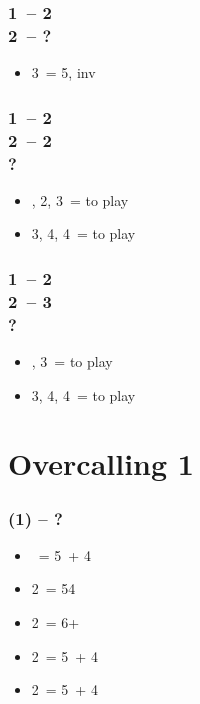 \subsubsection*{1\ntx\ -- 2\hearts \\
                2\spades\ -- ?}
\begin{itemize}
    \item 3\hearts\ = 5\hearts, inv
\end{itemize}

\subsubsection*{1\ntx\ -- 2\diams \\
                2\hearts\ -- 2\spades \\
                ?}
\begin{itemize}
    \item \pass, 2\nt, 3\hearts\ = to play
    \item 3\nt, 4\hearts, 4\spades\ = to play
\end{itemize}

\subsubsection*{1\ntx\ -- 2\hearts \\
                2\spades\ -- 3\hearts \\
                ?}
\begin{itemize}
    \item \pass, 3\spades\ = to play
    \item 3\nt, 4\hearts, 4\spades\ = to play
\end{itemize}

\section{\texorpdfstring{Overcalling 1\ntx}{overcalling1nt}}\label{sec:overcalling1nt}

\subsubsection*{(1\ntx) -- ?}
\begin{itemize}
    \item \dbl\ = 5\minor\ + 4\major
    \item 2\clubs\ = 54 \major
    \item 2\diams\ = 6+ \major
    \item 2\hearts\ = 5\hearts\ + 4\minor
    \item 2\spades\ = 5\spades\ + 4\minor
\end{itemize}

